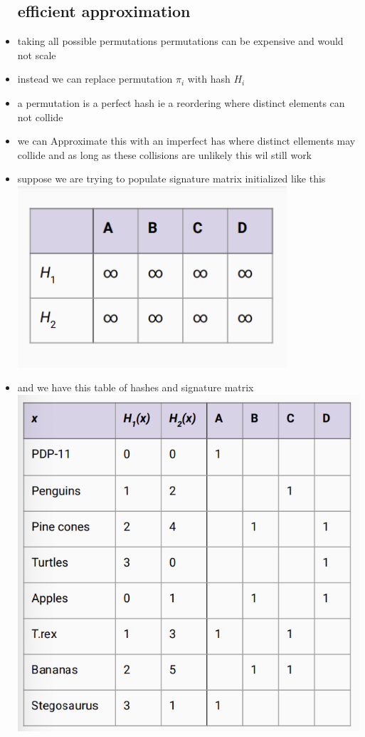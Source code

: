 \documentclass{article}
\begin{document}
\begin{itemize}
\subsection*{efficient approximation }
\item taking all possible permutations permutations can be expensive and would not scale
\item instead we can replace permutation $\pi_{i}$ with hash $H_i$
\item a permutation is a perfect hash ie a reordering where distinct elements can not collide
\item we can Approximate this with an imperfect has where distinct ellements may collide and as long as these collisions are unlikely this wil still work 
\item suppose we are trying to populate signature matrix initialized like this \includegraphics*[width=10cm]{images/Screenshot 2023-05-11 at 2.04.35 AM.png}
\item and we have this table of hashes and signature matrix \\ \includegraphics*{images/Screenshot 2023-05-11 at 2.04.59 AM.png}

\end{itemize}
\end{document}

